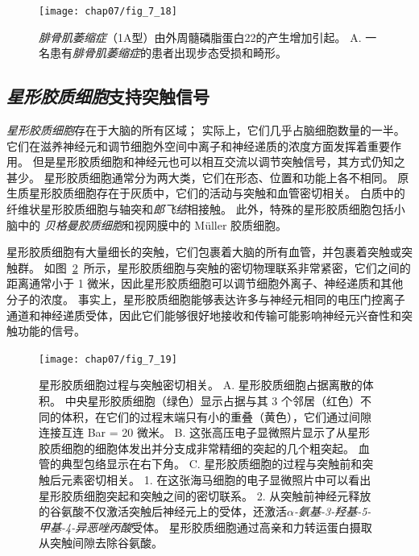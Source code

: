 \begin{figure}[htbp]
	\centering
	\texttt{[image: chap07/fig\_7\_18]}
	\caption{\textit{腓骨肌萎缩症}（1A型）由外周髓磷脂蛋白22的产生增加引起。
	A. 一名患有\textit{腓骨肌萎缩症}的患者出现步态受损和畸形。}
	\label{fig:7_18}
\end{figure}




\subsection{\textit{星形胶质细胞}支持突触信号}

\textit{星形胶质细胞}存在于大脑的所有区域；
实际上，它们几乎占脑细胞数量的一半。
它们在滋养神经元和调节细胞外空间中离子和神经递质的浓度方面发挥着重要作用。
但是星形胶质细胞和神经元也可以相互交流以调节突触信号，其方式仍知之甚少。
星形胶质细胞通常分为两大类，它们在形态、位置和功能上各不相同。
原生质星形胶质细胞存在于灰质中，它们的活动与突触和血管密切相关。
白质中的纤维状星形胶质细胞与轴突和\textit{郎飞结}相接触。
此外，特殊的星形胶质细胞包括小脑中的 \textit{贝格曼胶质细胞}和视网膜中的 Müller 胶质细胞。


星形胶质细胞有大量细长的突触，它们包裹着大脑的所有血管，并包裹着突触或突触群。
如图~\ref{fig:7_19}~所示，星形胶质细胞与突触的密切物理联系非常紧密，它们之间的距离通常小于 1 微米，因此星形胶质细胞可以调节细胞外离子、神经递质和其他分子的浓度。
事实上，星形胶质细胞能够表达许多与神经元相同的电压门控离子通道和神经递质受体，因此它们能够很好地接收和传输可能影响神经元兴奋性和突触功能的信号。


\begin{figure}[htbp]
	\centering
	\texttt{[image: chap07/fig\_7\_19]}
	\caption{星形胶质细胞过程与突触密切相关。
		A. 星形胶质细胞占据离散的体积。
		中央星形胶质细胞（绿色）显示占据与其 3 个邻居（红色）不同的体积，在它们的过程末端只有小的重叠（黄色），它们通过间隙连接互连 Bar = 20 微米\cite{bushong2002protoplasmic}。
		B. 这张高压电子显微照片显示了从星形胶质细胞的细胞体发出并分支成非常精细的突起的几个粗突起。
		血管的典型包络显示在右下角\cite{hama1994three}。
		C. 星形胶质细胞的过程与突触前和突触后元素密切相关。
		1. 在这张海马细胞的电子显微照片中可以看出星形胶质细胞突起和突触之间的密切联系\cite{ventura1999three}。
		2. 从突触前神经元释放的谷氨酸不仅激活突触后神经元上的受体，还激活\textit{$\alpha$-氨基-3-羟基-5-甲基-4-异恶唑丙酸}受体。
		星形胶质细胞通过高亲和力转运蛋白摄取从突触间隙去除谷氨酸\cite{gallo2001unwrapping}。}
	\label{fig:7_19}
\end{figure}


